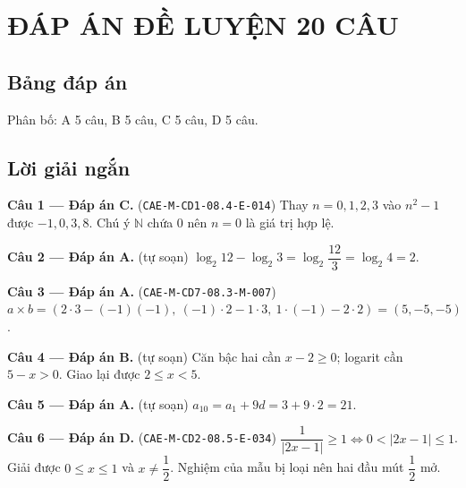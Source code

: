 \documentclass[11pt, a4paper]{article}
\begin{document}
\section{ĐÁP ÁN ĐỀ LUYỆN 20 CÂU}

\subsection{Bảng đáp án}



Phân bố: A 5 câu, B 5 câu, C 5 câu, D 5 câu.

\subsection{Lời giải ngắn}

\textbf{Câu 1 — Đáp án C.} (\texttt{CAE-M-CD1-08.4-E-014}) Thay $n = 0, 1, 2, 3$ vào $n^2 - 1$ được $-1, 0, 3, 8$. Chú ý $\mathbb{N}$ chứa $0$ nên $n = 0$ là giá trị hợp lệ.

\textbf{Câu 2 — Đáp án A.} (tự soạn) $\log_2 12 - \log_2 3 = \log_2 \dfrac{12}{3} = \log_2 4 = 2$.

\textbf{Câu 3 — Đáp án A.} (\texttt{CAE-M-CD7-08.3-M-007}) $a \times b = (2 \cdot 3 - (-1)(-1),\ (-1) \cdot 2 - 1 \cdot 3,\ 1 \cdot (-1) - 2 \cdot 2) = (5, -5, -5)$.

\textbf{Câu 4 — Đáp án B.} (tự soạn) Căn bậc hai cần $x - 2 \ge 0$; logarit cần $5 - x > 0$. Giao lại được $2 \le x < 5$.

\textbf{Câu 5 — Đáp án A.} (tự soạn) $a_{10} = a_1 + 9d = 3 + 9 \cdot 2 = 21$.

\textbf{Câu 6 — Đáp án D.} (\texttt{CAE-M-CD2-08.5-E-034}) $\dfrac{1}{\lvert 2x-1 \rvert} \ge 1 \iff 0 < \lvert 2x-1 \rvert \le 1$. Giải được $0 \le x \le 1$ và $x \ne \dfrac{1}{2}$. Nghiệm của mẫu bị loại nên hai đầu mút $\dfrac{1}{2}$ mở.
\end{document}
